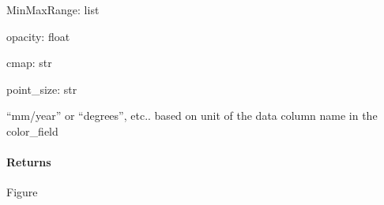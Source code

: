 \documentclass[letterpaper,10pt,english]{sphinxmanual}
\begin{document}
\begin{fulllineitems}
\sphinxAtStartPar
MinMaxRange: list

\sphinxAtStartPar
opacity: float

\sphinxAtStartPar
cmap: str

\sphinxAtStartPar
point\_size: str
\begin{description}
\sphinxAtStartPar
“mm/year” or “degrees”, etc.. based on unit of the data column name in the color\_field

\end{description}


\paragraph{Returns}
\label{\detokenize{akhdefo_functions:returns}}
\sphinxAtStartPar
Figure

\end{fulllineitems}

\end{document}
